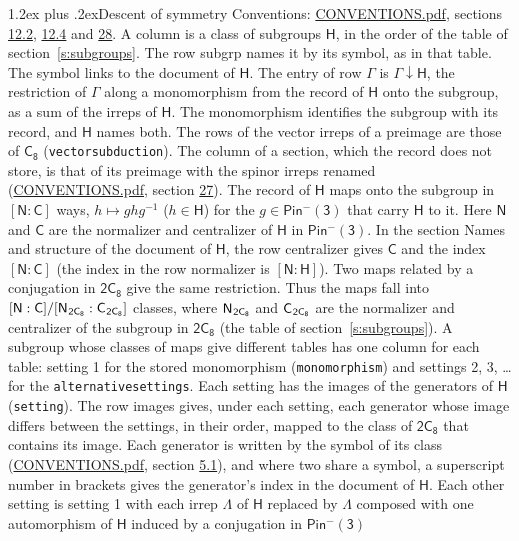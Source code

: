\documentclass[10pt,a4paper]{article}
\makeatletter
\renewcommand\section{\@startsection{section}{1}{\z@}{-3ex plus -1ex minus -.2ex}%
  {1.2ex plus .2ex}{\normalfont\large\sffamily\bfseries\color{parttitle}}}
\numberwithin{equation}{section}
\newcommand{\grp}[1]{\mathsf{#1}}
\newcommand{\grpindex}[2]{[#1 : #2]}
\newcommand{\restr}[2]{#1\!\downarrow#2}
\newcommand{\hairsp}{\mkern1mu}
\makeatother
\begin{document}
\section{Descent of symmetry}\label{s:subduction}
Conventions: \href{../../CONVENTIONS.pdf}{CONVENTIONS.pdf}, sections \href{../../../rotation/CONVENTIONS.pdf\#conv.12.2}{12.2}, \href{../../../rotation/CONVENTIONS.pdf\#conv.12.4}{12.4} and \href{../../CONVENTIONS.pdf\#conv.28}{28}.
A column is a class of subgroups $\grp{H}$, in the order of the table of section~\ref{s:subgroups}. The row subgrp names it by its symbol, as in that table. The symbol links to the document of $\grp{H}$. The entry of row $\Gamma$ is $\restr{\Gamma}{\grp{H}}$, the restriction of $\Gamma$ along a monomorphism from the record of $\grp{H}$ onto the subgroup, as a sum of the irreps of $\grp{H}$. The monomorphism identifies the subgroup with its record, and $\grp{H}$ names both. The rows of the vector irreps of a preimage are those of \href{../../../rotation/data/pdf/C8.pdf}{$\grp{C_{8}}$} (\texttt{vectorsubduction}). The column of a section, which the record does not store, is that of its preimage with the spinor irreps renamed (\href{../../CONVENTIONS.pdf}{CONVENTIONS.pdf}, section \href{../../CONVENTIONS.pdf\#conv.27}{27}). \label{n:group.normalizer.o3}\label{n:group.centralizer.o3}\label{n:element.h}The record of $\grp{H}$ maps onto the subgroup in $\grpindex{\grp{N}}{\grp{C}}$ ways, $h \mapsto g h g^{-1}$ ($h \in \grp{H}$) for the $g \in \grp{Pin^{-}(3)}$ that carry $\grp{H}$ to it. Here $\grp{N}$ and $\grp{C}$ are the normalizer and centralizer of $\grp{H}$ in \href{Pinminus3.pdf}{$\grp{Pin^{-}(3)}$}. In the section Names and structure of the document of $\grp{H}$, the row centralizer gives $\grp{C}$ and the index $\grpindex{\grp{N}}{\grp{C}}$ (the index in the row normalizer is $\grpindex{\grp{N}}{\grp{H}}$). Two maps related by a conjugation in $\grp{2C_{8}}$ give the same restriction. Thus the maps fall into $\grpindex{\grp{N}}{\grp{C}}/\grpindex{\grp{N}_{\hairsp \grp{2C_{8}}}}{\grp{C}_{\hairsp \grp{2C_{8}}}}$ classes, where $\grp{N}_{\hairsp \grp{2C_{8}}}$ and $\grp{C}_{\hairsp \grp{2C_{8}}}$ are the normalizer and centralizer of the subgroup in $\grp{2C_{8}}$ (the table of section~\ref{s:subgroups}). \label{n:head.setting}A subgroup whose classes of maps give different tables has one column for each table: setting 1 for the stored monomorphism (\texttt{monomorphism}) and settings 2, 3, \dots{} for the \texttt{alternativesettings}. Each setting has the images of the generators of $\grp{H}$ (\texttt{setting}). \label{n:head.images}The row images gives, under each setting, each generator whose image differs between the settings, in their order, mapped to the class of $\grp{2C_{8}}$ that contains its image. Each generator is written by the symbol of its class (\href{../../CONVENTIONS.pdf}{CONVENTIONS.pdf}, section \href{../../../rotation/CONVENTIONS.pdf\#conv.5.1}{5.1}), and where two share a symbol, a superscript number in brackets gives the generator's index in the document of $\grp{H}$. \label{n:irrep.Delta}Each other setting is setting 1 with each irrep $\Lambda$ of $\grp{H}$ replaced by $\Lambda$ composed with one automorphism of $\grp{H}$ induced by a conjugation in \href{Pinminus3.pdf}{$\grp{Pin^{-}(3)}$} 
\end{document}
